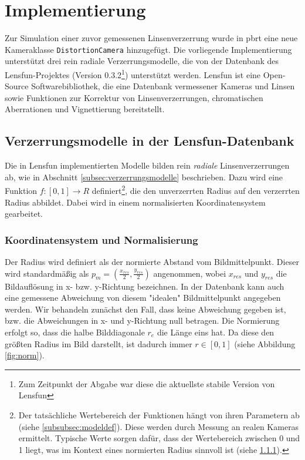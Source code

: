 \newpage
\section{Implementierung}

Zur Simulation einer zuvor gemessenen Linsenverzerrung wurde in pbrt eine neue Kameraklasse \texttt{DistortionCamera} hinzugefügt. Die vorliegende Implementierung unterstützt drei rein radiale Verzerrungsmodelle, die von der Datenbank des Lensfun-Projektes\cite{lensfun_basic} (Version 0.3.2\footnote{Zum Zeitpunkt der Abgabe war diese die aktuellste stabile Version von Lensfun}) unterstützt werden. Lensfun ist eine Open-Source Softwarebibliothek, die eine Datenbank vermessener Kameras und Linsen sowie Funktionen zur Korrektur von Linsenverzerrungen, chromatischen Aberrationen und Vignettierung bereitstellt.

\subsection{Verzerrungsmodelle in der Lensfun-Datenbank}

Die in Lensfun implementierten Modelle bilden rein \emph{radiale} Linsenverzerrungen ab, wie in Abschnitt \ref{subsec:verzerrungsmodelle} beschrieben. Dazu wird eine Funktion $f:[0,1] \rightarrow R$ definiert\footnote{Der tatsächliche Wertebereich der Funktionen hängt von ihren Parametern ab (siehe \ref{subsubsec:modeldef}). Diese werden durch Messung an realen Kameras ermittelt. Typische Werte sorgen dafür, dass der Wertebereich zwischen 0 und 1 liegt, was im Kontext eines normierten Radius sinnvoll ist (siehe \ref{subsubsec:norm_radius}).}, die den unverzerrten Radius auf den verzerrten Radius abbildet. Dabei wird in einem normalisierten Koordinatensystem gearbeitet.

\subsubsection{Koordinatensystem und Normalisierung}
\label{subsubsec:norm_radius}

Der Radius wird definiert als der normierte Abstand vom Bildmittelpunkt. Dieser wird standardmäßig als $p_m = (\frac{x_{res}}{2}, \frac{y_{res}}{2})$ angenommen, wobei $x_{res}$ und $y_{res}$ die Bildauflösung in x- bzw. y-Richtung bezeichnen. In der Datenbank kann auch eine gemessene Abweichung von diesem "idealen" Bildmittelpunkt angegeben werden. Wir behandeln zunächst den Fall, dass keine Abweichung gegeben ist, bzw. die Abweichungen in x- und y-Richtung null betragen. Die Normierung erfolgt so, dass die halbe Bilddiagonale $r_e$ die Länge eins hat. Da diese den größten Radius im Bild darstellt, ist dadurch immer $r \in [0,1]$ (siehe Abbildung \ref{fig:norm}). 


